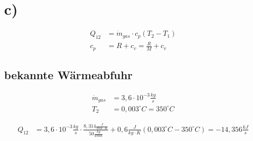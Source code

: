 

\section*{c)}
\begin{align*}
    Q_{12} &= \dot{m}_{gas} \cdot c_p \left( T_2 - T_1 \right) \\
    c_p &= R + c_v = \frac{R}{M} + c_v
\end{align*}

\subsection*{bekannte Wärmeabfuhr}
\begin{align*}
    \dot{m}_{gas} &= 3,6 \cdot 10^{-3} \frac{kg}{s} \\
    T_2 &= 0,003^\circ C = 350^\circ C
\end{align*}

\begin{align*}
    Q_{12} &= 3,6 \cdot 10^{-3} \frac{kg}{s} \cdot \frac{8,314 \frac{J}{mol \cdot K}}{50 \frac{kg}{kmol}} + 0,6 \frac{J}{kg \cdot K} \left( 0,003^\circ C - 350^\circ C \right) = -14,356 \frac{kJ}{s}
\end{align*}